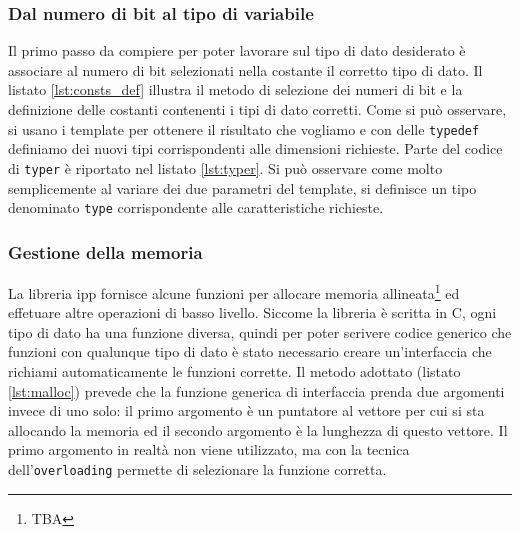 \subsubsection{Dal numero di bit al tipo di variabile}
Il primo passo da compiere per poter lavorare sul tipo di dato desiderato \`e
associare al numero di bit selezionati nella costante il corretto tipo di dato.
Il listato \ref{lst:consts_def} illustra il metodo di selezione dei numeri di bit e
la definizione delle costanti contenenti i tipi di dato corretti. Come si pu\`o
osservare, si usano i template per ottenere il risultato che vogliamo e con
delle \texttt{typedef} definiamo dei nuovi tipi corrispondenti alle dimensioni
richieste. Parte del codice di \texttt{typer} \`e riportato nel listato
\ref{lst:typer}. Si pu\`o osservare come molto semplicemente al variare dei due
parametri del template, si definisce un tipo denominato \texttt{type}
corrispondente alle caratteristiche richieste.





\subsubsection{Gestione della memoria}
La libreria \ac{ipp} fornisce alcune funzioni per allocare memoria
allineata\footnote{TBA} ed effetuare altre operazioni di basso livello. Siccome
la libreria \`e scritta in C, ogni tipo di dato ha una funzione diversa, quindi
per poter scrivere codice generico che funzioni con qualunque tipo di dato \`e
stato necessario creare un'interfaccia \CC che richiami automaticamente le
funzioni corrette. Il metodo adottato (listato \ref{lst:malloc}) prevede che la
funzione generica di interfaccia prenda due argomenti invece di uno solo: il
primo argomento \`e un puntatore al vettore per cui si sta allocando la memoria
ed il secondo argomento \`e la lunghezza di questo vettore. Il primo argomento
in realt\`a non viene utilizzato, ma con la tecnica dell'\texttt{overloading}
permette di selezionare la funzione corretta.



